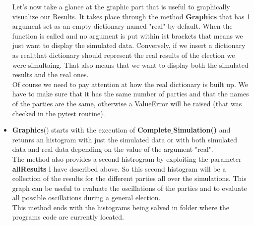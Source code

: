 \documentclass[12pt,a4paper,openright]{report}
\begin{document}
\begin{itemize}
Let's now take a glance at the graphic part that is useful to graphically visualize our Results. It takes place through the method \textbf{Graphics} that has 1 argument set as an empty dictionary named "real" by default. When the function is called and no argument is put within ist brackets that means we just want to display the simulated data. Conversely, if we insert a dictionary as real,that dictionary should represent the real results of the election we were simultaing. That also means that  we want to display both the simulated results and the real ones.\\
Of course we need to pay attention at how the real dictionary is built up. We have to make sure that it has the same number of parties and that the names of the parties are the same, otherwise a ValueError will be raised (that was checked in the pytest routine).
\item
\textbf{Graphics}() starts with the execution of \textbf{Complete$\_$Simulation()} and retunrs an histogram with just the simulated data or with both simulated data and real data depending on the value of the argument "real".\\
The method also provides a second histrogram by exploiting the parameter \textbf{allResults} I have described above. So this second histogram will be a collection of the results for the different parties all over the simulations. This graph can be useful to evaluate the oscillations of the parties and to evaluate all possible oscillations during a general election.\\
This method ends with the histograms being salved in folder where the programs code are currently located.
\end{itemize}
\end{document}
